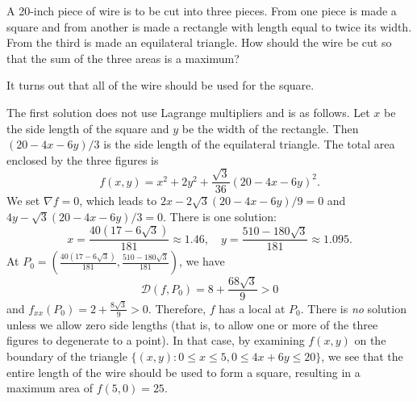\begin{problem}
  A 20-inch piece of wire is to be cut into three pieces. From one piece is made a square and from another is made a rectangle with length equal to twice its width. From the third is made an equilateral triangle. How should the wire be cut so that the sum of the three areas is a maximum?
\end{problem}
\begin{solution}
  It turns out that all of the wire should be used for the square.

  The first solution does not use Lagrange multipliers and is as follows. Let $x$ be the side length of the square and $y$ be the width of the rectangle. Then $(20-4x-6y)/3$ is the side length of the equilateral triangle. The total area enclosed by the three figures is
  \[f(x,y)=x^2+2y^2+\frac{\sqrt3}{36}(20-4x-6y)^2.\]
  We set $\nabla f=0$, which leads to $2x-2\sqrt3(20-4x-6y)/9=0$ and $4y-\sqrt3(20-4x-6y)/3=0$. There is one solution:
  \[x=\frac{40(17-6\sqrt3)}{181}\approx 1.46,\quad y=\frac{510-180\sqrt3}{181}\approx 1.095.\]
  At $P_0=\left(\frac{40(17-6\sqrt3)}{181},\frac{510-180\sqrt3}{181}\right)$, we have
  \[\mathcal D(f,P_0)=8+\frac{68\sqrt3}{9}>0\]
  and $f_{xx}(P_0)=2+\frac{8\sqrt3}{9}>0$. Therefore, $f$ has a local  at $P_0$. There is \emph{no} solution unless we allow zero side lengths (that is, to allow one or more of the three figures to degenerate to a point). In that case, by examining $f(x,y)$ on the boundary of the triangle $\{(x,y):0\leq x\leq 5,0\leq 4x+6y\leq 20\}$, we see that the entire length of the wire should be used to form a square, resulting in a maximum area of $f(5,0)=25$.
\end{solution}
